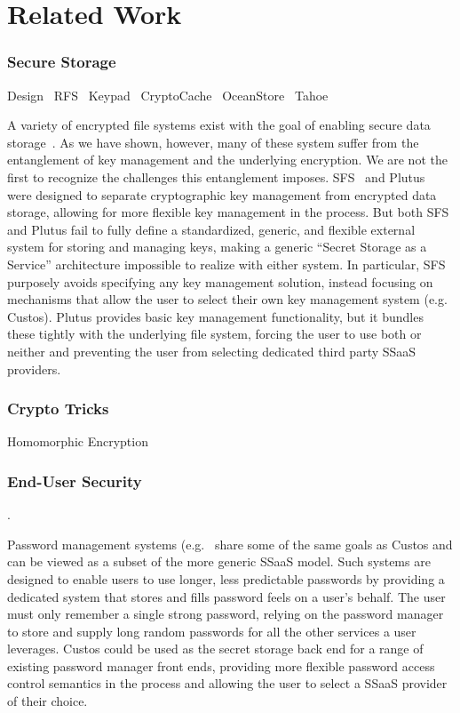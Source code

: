 \chapter{Related Work}
\label{chap:related}

\subsection{Secure Storage}
Design~\cite{Wulf1974}
RFS~\cite{Dong2011}
Keypad~\cite{Geambasu2011}
CryptoCache~\cite{Jensen2000}
OceanStore~\cite{Kubiatowicz2000}
Tahoe~\cite{Wilcox-O'Hearn2008}

A variety of encrypted file systems exist with the goal of enabling
secure data storage~\cite{Kher2005}. As we have shown, however, many
of these system suffer from the entanglement of key management and the
underlying encryption. We are not the first to recognize the
challenges this entanglement imposes. SFS~\cite{Mazieres1999} and
Plutus~\cite{Kallahalla2003} were designed to separate cryptographic
key management from encrypted data storage, allowing for more flexible
key management in the process. But both SFS and Plutus fail to fully
define a standardized, generic, and flexible external system for
storing and managing keys, making a generic ``Secret Storage as a
Service'' architecture impossible to realize with either system. In
particular, SFS purposely avoids specifying any key management
solution, instead focusing on mechanisms that allow the user to select
their own key management system (e.g. Custos). Plutus provides basic
key management functionality, but it bundles these tightly with the
underlying file system, forcing the user to use both or neither and
preventing the user from selecting dedicated third party SSaaS
providers.

\subsection{Crypto Tricks}
Homomorphic Encryption

\subsection{End-User Security}
\cite{openpgp, pgp, gnupg}
\cite{enigmail, mailpile, Koch2011}
\cite{lastpass, onepassword, apple-icloud}
\cite{schneier-passwords, krebs-passwords, brodkin-passman}.
\cite{spideroak}

Password management systems (e.g.~\cite{lastpass} share some of the
same goals as Custos and can be viewed as a subset of the more generic
SSaaS model. Such systems are designed to enable users to use longer,
less predictable passwords by providing a dedicated system that stores
and fills password feels on a user's behalf. The user must only
remember a single strong password, relying on the password manager to
store and supply long random passwords for all the other services a
user leverages. Custos could be used as the secret storage back end
for a range of existing password manager front ends, providing more
flexible password access control semantics in the process and allowing
the user to select a SSaaS provider of their choice.

